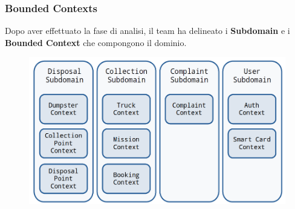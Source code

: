 \begin{frame}
    \frametitle{Bounded Contexts}
    Dopo aver effettuato la fase di analisi, il team ha delineato i \textbf{Subdomain} e i \textbf{Bounded Context} che
    compongono il dominio.

    \smallskip

    \begin{figure}[H]
        \centering
        \includegraphics[width=0.8\linewidth]{../img/bounded-contexts}
    \end{figure}

\end{frame}
